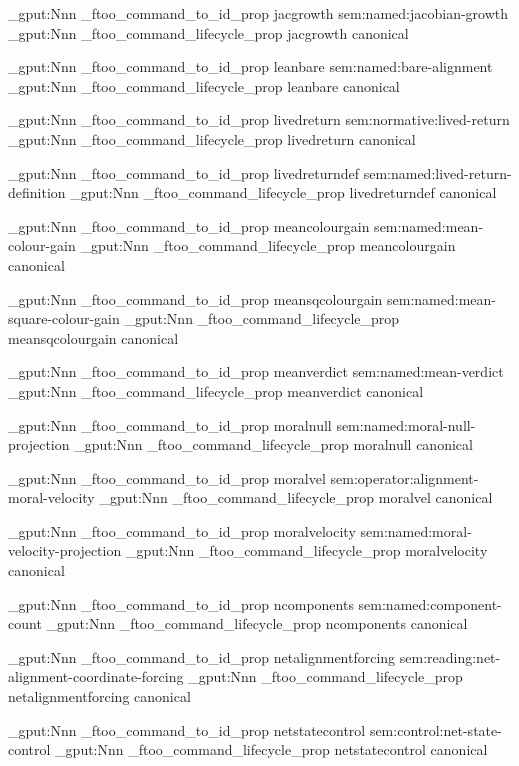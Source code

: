 \prop_gput:Nnn \g_ftoo_command_to_id_prop { jacgrowth } { sem:named:jacobian-growth }
\prop_gput:Nnn \g_ftoo_command_lifecycle_prop { jacgrowth } { canonical }


\prop_gput:Nnn \g_ftoo_command_to_id_prop { leanbare } { sem:named:bare-alignment }
\prop_gput:Nnn \g_ftoo_command_lifecycle_prop { leanbare } { canonical }


\prop_gput:Nnn \g_ftoo_command_to_id_prop { livedreturn } { sem:normative:lived-return }
\prop_gput:Nnn \g_ftoo_command_lifecycle_prop { livedreturn } { canonical }


\prop_gput:Nnn \g_ftoo_command_to_id_prop { livedreturndef } { sem:named:lived-return-definition }
\prop_gput:Nnn \g_ftoo_command_lifecycle_prop { livedreturndef } { canonical }


\prop_gput:Nnn \g_ftoo_command_to_id_prop { meancolourgain } { sem:named:mean-colour-gain }
\prop_gput:Nnn \g_ftoo_command_lifecycle_prop { meancolourgain } { canonical }


\prop_gput:Nnn \g_ftoo_command_to_id_prop { meansqcolourgain } { sem:named:mean-square-colour-gain }
\prop_gput:Nnn \g_ftoo_command_lifecycle_prop { meansqcolourgain } { canonical }


\prop_gput:Nnn \g_ftoo_command_to_id_prop { meanverdict } { sem:named:mean-verdict }
\prop_gput:Nnn \g_ftoo_command_lifecycle_prop { meanverdict } { canonical }


\prop_gput:Nnn \g_ftoo_command_to_id_prop { moralnull } { sem:named:moral-null-projection }
\prop_gput:Nnn \g_ftoo_command_lifecycle_prop { moralnull } { canonical }


\prop_gput:Nnn \g_ftoo_command_to_id_prop { moralvel } { sem:operator:alignment-moral-velocity }
\prop_gput:Nnn \g_ftoo_command_lifecycle_prop { moralvel } { canonical }


\prop_gput:Nnn \g_ftoo_command_to_id_prop { moralvelocity } { sem:named:moral-velocity-projection }
\prop_gput:Nnn \g_ftoo_command_lifecycle_prop { moralvelocity } { canonical }


\prop_gput:Nnn \g_ftoo_command_to_id_prop { ncomponents } { sem:named:component-count }
\prop_gput:Nnn \g_ftoo_command_lifecycle_prop { ncomponents } { canonical }


\prop_gput:Nnn \g_ftoo_command_to_id_prop { netalignmentforcing } { sem:reading:net-alignment-coordinate-forcing }
\prop_gput:Nnn \g_ftoo_command_lifecycle_prop { netalignmentforcing } { canonical }


\prop_gput:Nnn \g_ftoo_command_to_id_prop { netstatecontrol } { sem:control:net-state-control }
\prop_gput:Nnn \g_ftoo_command_lifecycle_prop { netstatecontrol } { canonical }


